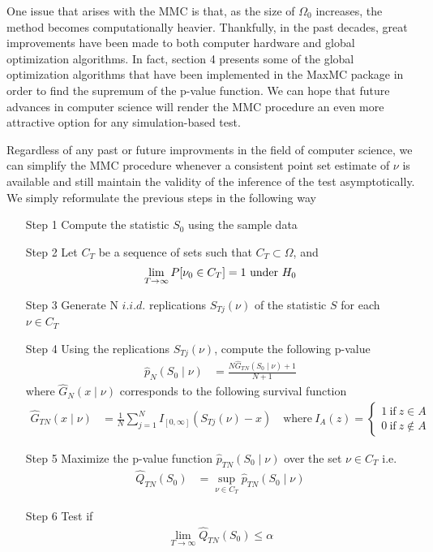 \documentclass[]{article}\usepackage[]{graphicx}\usepackage[]{color}
\newcommand{\pkg}[1]{{\normalfont\fontseries{b}\selectfont #1}}
\begin{document}
One issue that arises with the MMC is that, as the size of $\Omega_0$ increases, the method becomes computationally heavier. Thankfully, in the past decades, great improvements have been made to both computer hardware and global optimization algorithms. In fact, section 4 presents some of the global optimization algorithms that have been implemented in the \pkg{MaxMC} package in order to find the supremum of the p-value function. We can hope that future advances in computer science will render the MMC procedure an even more attractive option for any simulation-based test.

Regardless of any past or future improvments in the field of computer science, we can simplify the MMC procedure whenever a consistent point set estimate of $\nu$ is available and still maintain the validity of the inference of the test asymptotically. We simply reformulate the previous steps in the following way
\begin{itemize}
	\item[Step 1] Compute the statistic $S_0$ using the sample data
	\item[Step 2] Let $C_T$ be a sequence of sets such that $C_T \subset \Omega$, and
	\begin{align}
	\label{eq:consistent}
	\lim\limits_{T \rightarrow \infty}P[\nu_0 \in C_T] = 1 \textnormal{ under } H_0
	\end{align}
	\item[Step 3] Generate N $i.i.d.$ replications $S_{Tj}(\nu)$ of the statistic $S$ for each $\nu \in C_T$
	\item[Step 4] Using the replications $S_{Tj}(\nu)$, compute the following p-value
	\begin{align}
	\hat{p}_{N}(S_{0} \mid \nu) & = \frac{N\hat{G}_{TN}(S_{0} \mid \nu)+1}{N+1}
	\end{align}
	where $\hat{G}_{N}(x \mid \nu)$ corresponds to the following survival function
	\begin{align}
	\hat{G}_{TN}(x \mid \nu) & =\frac{1}{N}\sum_{j=1}^{N}I_{[0,\infty]}(S_{Tj}(\nu)-x) \quad \mathrm{where} \ I_{A}(z)=\left\{\begin{array}{l}
	1\ \mathrm{if}\ z\in A\\
	0\ \mathrm{if}\ z\not\in A
	\end{array}\right.
	\end{align}

	\item[Step 5] Maximize the p-value function $\hat{p}_{TN}(S_{0} \mid \nu)$ over the set $\nu \in C_T$ i.e.
	\begin{align}
	\hat{Q}_{TN}(S_0) & = \sup_{\nu \in C_T} \hat{p}_{TN}(S_{0} \mid \nu)
	\end{align}

	\item[Step 6] Test if
	\begin{align}
	\lim\limits_{T \rightarrow \infty}\hat{Q}_{TN}(S_{0})\leq \alpha
	\end{align}
\end{itemize}
\end{document}
